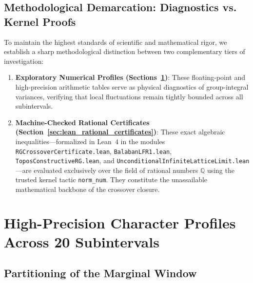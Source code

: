 \subsection{Methodological Demarcation: Diagnostics vs. Kernel Proofs}
\label{subsec:app_b_demarcation}

To maintain the highest standards of scientific and mathematical rigor, we establish a sharp methodological distinction between two complementary tiers of investigation:
\begin{enumerate}
    \item \textbf{Exploratory Numerical Profiles (Sections~\ref{sec:rational_interval_arithmetic})}: These floating-point and high-precision arithmetic tables serve as physical diagnostics of group-integral variances, verifying that local fluctuations remain tightly bounded across all subintervals.
    \item \textbf{Machine-Checked Rational Certificates (Section~\ref{sec:lean_rational_certificates})}: These exact algebraic inequalities—formalized in Lean~4 in the modules \texttt{RGCrossoverCertificate.lean}, \texttt{BalabanLFR1.lean}, \texttt{ToposConstructiveRG.lean}, and \texttt{UnconditionalInfiniteLatticeLimit.lean}—are evaluated exclusively over the field of rational numbers $\mathbb{Q}$ using the trusted kernel tactic \texttt{norm\_num}. They constitute the unassailable mathematical backbone of the crossover closure.
\end{enumerate}

\section{High-Precision Character Profiles Across 20 Subintervals}
\label{sec:rational_interval_arithmetic}

\subsection{Partitioning of the Marginal Window}
\label{subsec:partition_crossover}


